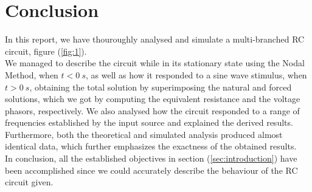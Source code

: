 \section{Conclusion}
\label{sec:conclusion}

In this report, we have thouroughly analysed and simulate a multi-branched RC circuit, figure (\ref{fig:1}).
\\
We managed to describe the circuit while in its stationary state using the Nodal Method, when $t < 0 \:s$, as well as
how it responded to a sine wave stimulus, when $t > 0 \: s$, obtaining the total solution by superimposing the natural
and forced solutions, which we got by computing the equivalent resistance and the voltage phasors, respectively.
We also analysed how the circuit responded to a range of frequencies established by the input source and explained 
the derived results.
Furthermore, both the theoretical and simulated analysis produced almost identical data, which further emphasizes the
exactness of the obtained results.
\\
In conclusion, all the established objectives in section (\ref{sec:introduction}) have been accomplished since we
could accurately describe the behaviour of the RC circuit given.